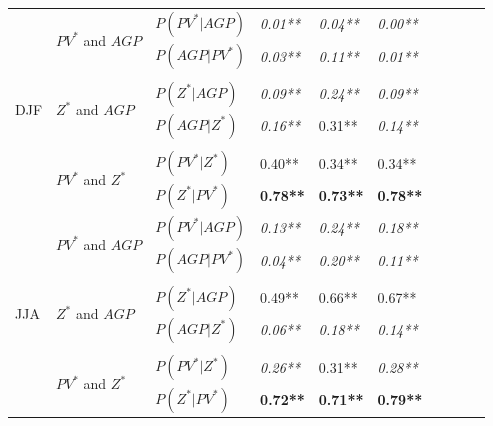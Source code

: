 \documentclass[smallextended]{svjour3}       %
\numberwithin{equation}{section}
\begin{document}
\begin{table}
\begin{tabular}{|l|l|l|l|l|l|l|l|l|l|}
  \hline
  \multirow{8}{*}{DJF} 
   & \multirow{2}{*}{$PV^* $ and $AGP$}&$P(PV^*|AGP)$ & \textit{{0.01**}} & \textit{{0.04**} }& \textit{{0.00**}} \\
   & & $P(AGP|PV^*)$ & \textit{{0.03**}} & \textit{0.11**}& \textit{{0.01**}} \\ 
      &&&&&\\
   & \multirow{2}{*}{$Z^*$ and $AGP$} &$P(Z^*|AGP)$  & \textit{0.09**} & \textit{{0.24**}} & \textit{0.09**} \\ 
   &&$P(AGP|Z^*)$  & \textit{{0.16**} }& {{0.31**} }& \textit{{0.14**} }\\ 
      &&&&&\\
      & \multirow{2}{*}{$PV^*$ and $Z^*$ } &$P(PV^*|Z^*)$    & {0.40**} & {0.34**} & {0.34**} \\
   &&$P(Z^*|PV^*)$   &\textbf{0.78**} & \textbf{0.73**} & \textbf{0.78**} \\   
   \hline
\multirow{8}{*}{JJA} 
   & \multirow{2}{*}{$PV^* $ and $AGP$}&$P(PV^*|AGP)$ & \textit{0.13**} & \textit{0.24**} & \textit{0.18**} \\  
   & & $P(AGP|PV^*)$  &\textit{{0.04**}} & \textit{{0.20**}} & \textit{{0.11**}} \\ 
   &&&&&\\
   & \multirow{2}{*}{$Z^*$ and $AGP$} &$P(Z^*|AGP)$  & {0.49**} & {0.66**} & {0.67**} \\  
   &&$P(AGP|Z^*)$    & \textit{{0.06**}} & \textit{{0.18**}} & \textit{{0.14**}} \\ 
      &&&&&\\
      & \multirow{2}{*}{$PV^*$ and $Z^*$ } &$P(PV^*|Z^*)$    & \textit{{0.26**}} & {{0.31**}}& \textit{{0.28**}} \\ 
   &&$P(Z^*|PV^*)$   & \textbf{{0.72**}} & {\textbf{0.71**}} & \textbf{0.79**} \\ 
   
  \hline
\end{tabular}
\end{table}
\end{document}
